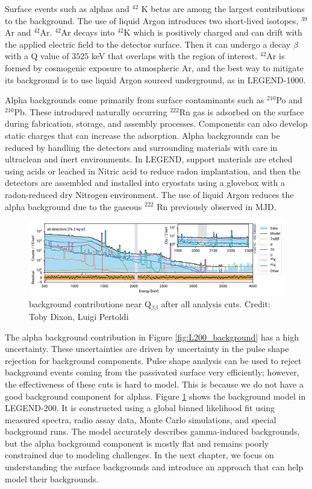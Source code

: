 Surface events such as alphas and $^{42}$ K betas are among the largest contributions to the background. The use of liquid Argon introduces two short-lived isotopes, $^{39}$Ar and $^{42}$Ar.  $^{42}$Ar decays into $^{42}$K which is positively charged and can drift with the applied electric field to the detector surface. Then it can undergo a decay $\beta$ with a Q value of $3525$ keV that overlaps with the region of interest. $^{42}$Ar is formed by cosmogenic exposure to atmospheric Ar, and the best way to mitigate its background is to use liquid Argon sourced underground, as in LEGEND-1000.

Alpha backgrounds come primarily from surface contaminants such as $^{210}$Po and $^{210}$Pb. These introduced naturally occurring $^{222}$Rn gas is adsorbed on the surface during fabrication, storage, and assembly processes. Components can also develop static charges that can increase the adsorption. Alpha backgrounds can be reduced by handling the detectors and surrounding materials with care in ultraclean and inert environments. In LEGEND, support materials are etched using acids or leached in Nitric acid to reduce radon implantation, and then the detectors are assembled and installed into cryostats using a glovebox with a radon-reduced dry Nitrogen environment. The use of liquid Argon reduces the alpha background due to the gaseous $^{222}$ Rn previously observed in MJD.

\begin{figure}
\centering
  \includegraphics[width=0.99\linewidth]{ch2/figs/l200_bkgmodel.png}
  \caption{{\Ltwo} background contributions near Q$_{\beta\beta}$ after all analysis cuts. Credit: Toby Dixon, Luigi Pertoldi}
\label{ch2:fig:L200_background_model_fit}
  \end{figure}

The alpha background contribution in Figure \ref{fig:L200_background} has a high uncertainty. These uncertainties are driven by uncertainty in the pulse shape rejection for background components. Pulse shape analysis can be used to reject background events coming from the passivated surface very efficiently; however, the effectiveness of these cuts is hard to model. This is because we do not have a good background component for alphas. Figure \ref{ch2:fig:L200_background_model_fit} shows the background model in LEGEND-200. It is constructed using a global binned likelihood fit using measured spectra, radio assay data, Monte Carlo simulations, and special background runs. The model accurately describes gamma-induced backgrounds, but the alpha background component is mostly flat and remains poorly constrained due to modeling challenges. In the next chapter, we focus on understanding the surface backgrounds and introduce an approach that can help model their backgrounds.
